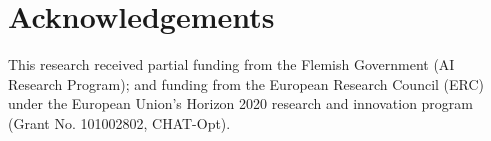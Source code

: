 \documentclass[letterpaper]{article} %
\begin{document}

\clearpage
\section{Acknowledgements}
This research received partial funding from the Flemish Government (AI Research Program); and funding from the European Research Council (ERC) under the European Union’s Horizon 2020 research and innovation program (Grant No. 101002802, CHAT-Opt).


  
\end{document}
